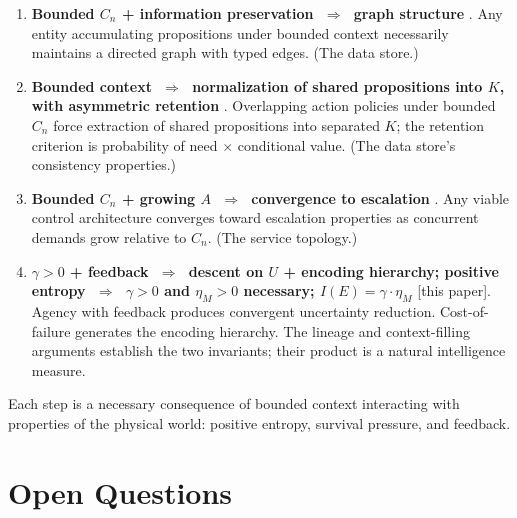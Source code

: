 \documentclass[11pt]{article}
\theoremstyle{definition}
\theoremstyle{remark}
\begin{document}
\begin{enumerate}
\item \textbf{Bounded $C_n$ + information preservation $\;\Rightarrow\;$
      graph structure} \cite{McCarthy2026a}. Any entity accumulating
      propositions under bounded context necessarily maintains a
      directed graph with typed edges. (The data store.)

\item \textbf{Bounded context $\;\Rightarrow\;$ normalization of shared
      propositions into $K$, with asymmetric retention}
      \cite{McCarthy2026b}. Overlapping action policies under bounded
      $C_n$ force extraction of shared propositions into separated $K$;
      the retention criterion is probability of need $\times$ conditional
      value. (The data store's consistency properties.)

\item \textbf{Bounded $C_n$ + growing $A$ $\;\Rightarrow\;$ convergence
      to escalation} \cite{McCarthy2026c}. Any viable control
      architecture converges toward escalation properties as concurrent
      demands grow relative to $C_n$. (The service topology.)

\item \textbf{$\gamma > 0$ + feedback $\;\Rightarrow\;$ descent on $U$
      + encoding hierarchy; positive entropy $\;\Rightarrow\;$
      $\gamma > 0$ and $\eta_M > 0$ necessary;
      $I(E) = \gamma \cdot \eta_M$} [this paper]. Agency with feedback
      produces convergent uncertainty reduction. Cost-of-failure
      generates the encoding hierarchy. The lineage and context-filling
      arguments establish the two invariants; their product is a natural
      intelligence measure.
\end{enumerate}

Each step is a necessary consequence of bounded context interacting
with properties of the physical world: positive entropy, survival
pressure, and feedback.

\section{Open Questions}
\label{sec:open}
\end{document}
